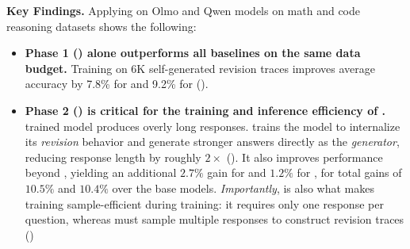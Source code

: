\textbf{Key Findings.} Applying \ours{} on Olmo and Qwen models on math and code reasoning datasets shows the following: 
\begin{itemize}
    \item {}\textbf{Phase 1 (\sft{}) alone outperforms all baselines on the same data budget.}
    Training on 6K self-generated revision traces improves average accuracy by 7.8\% for \qwen{} and 9.2\% for \olmo{} (). 
    
    
    \item {}\textbf{Phase 2 (\opsd{}) is critical for the training and inference efficiency of \ours{}.}
     \sft{} trained model produces overly long responses. \opsd{} trains the model to internalize its \textit{revision} behavior and generate stronger answers directly as the \textit{generator}, reducing response length by roughly $2\times$ (). It also improves performance beyond \sft{}, yielding an additional $2.7\%$ gain for \qwen{} and $1.2\%$ for \olmo{}, for total gains of $10.5\%$ and $10.4\%$ over the base models. \emph{Importantly}, \opsd{} is also what makes \ours{} training sample-efficient during training: it requires only one response per question, whereas \sft{} must sample multiple responses to construct revision traces ()


\end{itemize}
